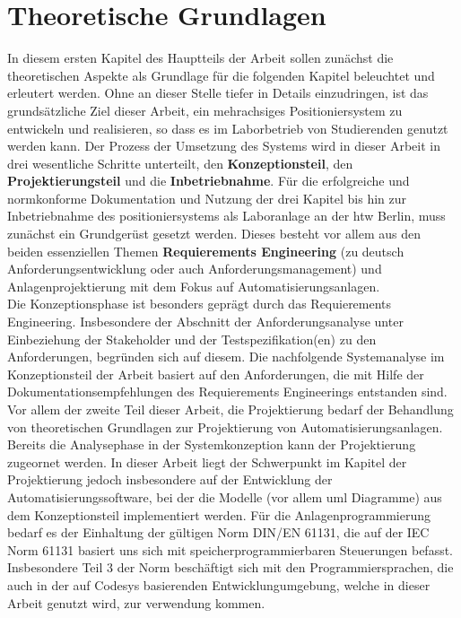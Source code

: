 \documentclass[../Bachelorarbeit.tex]{subfiles}
\begin{document}
\section{Theoretische Grundlagen}
In diesem ersten Kapitel des Hauptteils der Arbeit sollen zunächst die theoretischen Aspekte als Grundlage für die folgenden Kapitel beleuchtet und erleutert werden. Ohne an dieser Stelle tiefer in Details einzudringen, ist das grundsätzliche Ziel dieser Arbeit, ein mehrachsiges Positioniersystem zu entwickeln und realisieren, so dass es im Laborbetrieb von Studierenden genutzt werden kann. Der Prozess der Umsetzung des Systems wird in dieser Arbeit in drei wesentliche Schritte unterteilt, den \textbf{Konzeptionsteil}, den \textbf{Projektierungsteil} und die \textbf{Inbetriebnahme}. Für die erfolgreiche und normkonforme Dokumentation und Nutzung der drei Kapitel bis hin zur Inbetriebnahme des positioniersystems als Laboranlage an der \ac{htw} Berlin, muss zunächst ein Grundgerüst gesetzt werden. Dieses besteht vor allem aus den beiden essenziellen Themen \textbf{Requierements Engineering} (zu deutsch Anforderungsentwicklung oder auch Anforderungsmanagement) und Anlagenprojektierung mit dem Fokus auf Automatisierungsanlagen.\\
Die Konzeptionsphase ist besonders geprägt durch das Requierements Engineering. Insbesondere der Abschnitt der Anforderungsanalyse unter Einbeziehung der Stakeholder und der Testspezifikation(en) zu den Anforderungen, begründen sich auf diesem. Die nachfolgende Systemanalyse im Konzeptionsteil der Arbeit basiert auf den Anforderungen, die mit Hilfe der Dokumentationsempfehlungen des Requierements Engineerings entstanden sind.\\
Vor allem der zweite Teil dieser Arbeit, die Projektierung bedarf der Behandlung von theoretischen Grundlagen zur Projektierung von Automatisierungsanlagen. Bereits die Analysephase in der Systemkonzeption kann der Projektierung zugeornet werden. In dieser Arbeit liegt der Schwerpunkt im Kapitel der Projektierung jedoch insbesondere auf der Entwicklung der Automatisierungssoftware, bei der die Modelle (vor allem \acs{uml} Diagramme) aus dem Konzeptionsteil implementiert werden. Für die Anlagenprogrammierung bedarf es der Einhaltung der gültigen Norm DIN/EN 61131, die auf der IEC Norm 61131 basiert uns sich mit speicherprogrammierbaren Steuerungen befasst. Insbesondere Teil 3 der Norm beschäftigt sich mit den Programmiersprachen, die auch in der auf Codesys basierenden Entwicklungumgebung, welche in dieser Arbeit genutzt wird, zur verwendung kommen. \\
\end{document}
